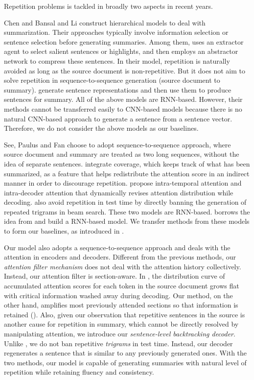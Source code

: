 Repetition problems is tackled in broadly two aspects in recent years. 

Chen and Bansal and Li construct hierarchical models to deal with summarization. Their approaches typically involve information selection or sentence selection before generating summaries. Among them, \cite{P18-1063} uses an extractor agent to select salient sentences or highlights, and then employs an abstractor network to compress these sentences. In their model, repetition is naturally avoided as long as the source document is non-repetitive. But it does not aim to solve repetition in sequence-to-sequence generation (source document to summary). \cite{D18-1205,D18-1441} generate sentence representations and then use them to produce sentences for summary. All of the above models are RNN-based. However, their methods cannot be transferred easily to CNN-based models because there is no natural CNN-based approach to generate a sentence from a sentence vector. Therefore, we do not consider the above models as our baselines.

See, Paulus and Fan choose to adopt sequence-to-sequence approach, where source document and summary are treated as two long sequences, without the idea of separate sentences. \cite{SeeLM17} integrate coverage, which keeps track of what has been summarized, as a feature that helps redistribute the attention score in an indirect manner in order to discourage repetition. \cite{PaulusXS17} propose intra-temporal attention and intra-decoder attention that dynamically revises attention distribution while decoding. \cite{PaulusXS17} also avoid repetition in test time by directly banning the generation of repeated trigrams in beam search. These two models are RNN-based. \cite{FanGA18} borrows the idea from \cite{PaulusXS17} and build a RNN-based model. We transfer methods from these models to form our baselines, as introduced in .

Our model also adopts a sequence-to-sequence approach and deals with the attention in encoders and decoders. Different from the previous methods, our \textit{attention filter mechanism} does not deal with the attention history collectively. Instead, our attention filter is section-aware. In \cite{SeeLM17,gehring2017convs2s}, the distribution curve of accumulated attention scores for each token in the source document grows flat with critical information washed away during decoding. Our method, on the other hand, amplifies most previously attended sections so that information is retained (). Also, given our observation that repetitive sentences in the source is another cause for repetition in summary, which cannot be directly resolved by manipulating attention, we introduce our \textit{sentence-level backtracking decoder}. Unlike \cite{PaulusXS17}, we do not ban repetitive \textit{trigrams} in test time. Instead, our decoder regenerates a sentence that is similar to any previously generated ones.   With the two methods, our model is capable of generating summaries with natural level of repetition while retaining fluency and consistency.



